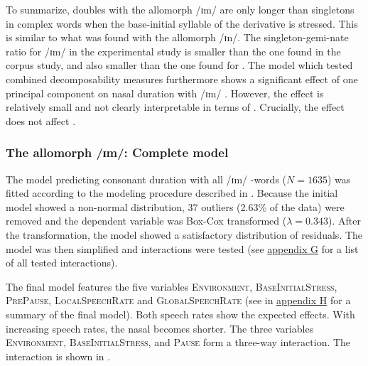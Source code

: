 To summarize,  doubles with the allomorph /ɪm/  are only longer than singletons in complex words when the base-initial syllable of the derivative is stressed. This is similar to what was found with the allomorph /ɪn/. The singleton-gemi-nate ratio for /ɪm/  in the experimental study is smaller than the one found in the corpus study, and also smaller than the one found for . 
The model which tested combined decomposability measures furthermore shows a significant effect of one principal component on nasal duration with /ɪm/ . However, the effect is relatively small and not clearly interpretable in terms of . Crucially, the effect does not affect .




\subsubsection{The allomorph /ɪm/: Complete model}

The model predicting consonant duration with all /ɪm/ -words ($N=1635$) was fitted according to the modeling procedure described in .  Because the initial model showed a non-normal distribution,  37 outliers (2.63\% of the data) were removed and the dependent variable was Box-Cox transformed ($\lambda = 0.343$). 
After the transformation, the model showed a satisfactory distribution of residuals. The model was then simplified and interactions were tested (see \hyperref[Appendix G Summaries of tested interactions in experimental study]{appendix G} for a list of all tested interactions). 

 
The final model features the five variables \textsc{Environment}, \textsc{BaseInitialStress}, \textsc{PrePause}, \textsc{LocalSpeechRate} and \textsc{GlobalSpeechRate} (see  in \hyperref[Appendix H: Model Summaries Experiment]{appendix H} for a summary of the final model). Both speech rates show the expected effects. With increasing speech rates, the nasal becomes shorter. The three variables \textsc{Environment}, \textsc{BaseInitialStress}, and \textsc{Pause} form a three-way interaction. The interaction is shown in .


